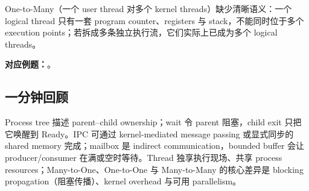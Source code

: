 One-to-Many（一个 user thread 对多个 kernel threads）缺少清晰语义：一个 logical thread 只有一套 program counter、registers 与 stack，不能同时位于多个 execution points；若拆成多条独立执行流，它们实际上已成为多个 logical threads。

\textbf{对应例题：}。

\subsection{一分钟回顾}

Process tree 描述 parent--child ownership；wait 令 parent 阻塞，child exit 只把它唤醒到 Ready。IPC 可通过 kernel-mediated message passing 或显式同步的 shared memory 完成；mailbox 是 indirect communication，bounded buffer 会让 producer/consumer 在满或空时等待。Thread 独享执行现场、共享 process resources；Many-to-One、One-to-One 与 Many-to-Many 的核心差异是 blocking propagation（阻塞传播）、kernel overhead 与可用 parallelism。
